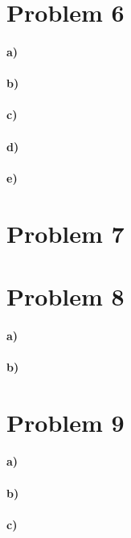 \documentclass[12pt]{article}
\begin{document}
\section*{Problem 6}

\paragraph{a)}

\paragraph{b)}

\paragraph{c)}

\paragraph{d)}

\paragraph{e)}

\section*{Problem 7}

\section*{Problem 8}

\paragraph{a)}

\paragraph{b)}

\section*{Problem 9}

\paragraph{a)}

\paragraph{b)}

\paragraph{c)}
\end{document}
